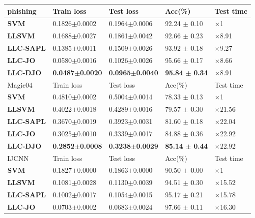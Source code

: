 \documentclass{llncs}
\begin{document}
	\begin{table}
		\begin{tabu} to \textwidth {|X[c]| X[c]| X[c]| X[c]| X[c]|}
			\hline
			phishing              & Train loss & Test loss & Acc(\%) &Test time \\
			\hline
			\textbf{SVM} 		   	&0.1826$\pm$0.0002  &0.1964$\pm$0.0006  & 92.24 $\pm$ 0.10 & $\times$1  \\ \hline
			\textbf{LLSVM}     		&0.1688$\pm$0.0027  &0.1861$\pm$0.0042  & 92.66 $\pm$ 0.23 & $\times$8.91 \\ \hline
			\textbf{LLC-SAPL}       &0.1385$\pm$0.0011  &0.1509$\pm$0.0026  & 93.92 $\pm$ 0.18 & $\times$9.27 \\ \hline
			\textbf{LLC-JO}         &0.0580$\pm$0.0016  &0.1026$\pm$0.0026  & 95.66 $\pm$ 0.17 & $\times$8.66 \\ \hline
			\textbf{LLC-DJO}         &\textbf{0.0487$\pm$0.0020}  &\textbf{0.0965$\pm$0.0040}  & \textbf{95.84 $\pm$ 0.34} &$\times$8.91 \\ \hline
			\hline
			Magic04              & Train loss & Test loss & Acc(\%) &Test time \\
			\hline
			\textbf{SVM} 		   	&0.4810$\pm$0.0002  &0.5004$\pm$0.0014  &78.33 $\pm$ 0.13  &$\times$1 \\ \hline
			\textbf{LLSVM}     		&0.4022$\pm$0.0018  &0.4289$\pm$0.0016  &79.57 $\pm$ 0.30  &$\times$21.56 \\ \hline
			\textbf{LLC-SAPL}       &0.3670$\pm$0.0019  &0.3923$\pm$0.0031  &81.60 $\pm$ 0.18  &$\times$22.04 \\ \hline
			\textbf{LLC-JO}         &0.3025$\pm$0.0010  &0.3339$\pm$0.0017  &84.88 $\pm$ 0.36  &$\times$22.92\\ \hline
			\textbf{LLC-DJO}         &\textbf{0.2852$\pm$0.0008}  &\textbf{0.3238$\pm$0.0029}  &\textbf{85.14 $\pm$ 0.44}   &$\times$22.92\\ \hline
			\hline
			IJCNN              & Train loss & Test loss & Acc(\%) &Test time\\
			\hline
			\textbf{SVM} 		   	&0.1827$\pm$0.0000  &0.1863$\pm$0.0000  & 90.50 $\pm$ 0.00  &$\times$1\\ \hline
			\textbf{LLSVM}     		&0.1081$\pm$0.0028  &0.1130$\pm$0.0039  & 94.51 $\pm$ 0.30  &$\times$15.52\\ \hline
			\textbf{LLC-SAPL}       &0.1002$\pm$0.0017  &0.1054$\pm$0.0015  & 95.17 $\pm$ 0.21  &$\times$15.78\\ \hline
			\textbf{LLC-JO}         &0.0703$\pm$0.0002  &0.0683$\pm$0.0024  & 97.66 $\pm$ 0.11  &$\times$16.30\\ \hline

\end{tabu}
\end{table}
\end{document}

